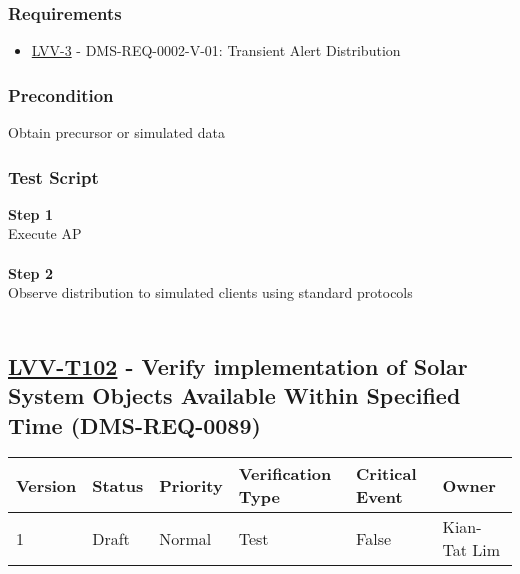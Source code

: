\hypertarget{requirements-78}{%
\subsubsection{Requirements}\label{requirements-78}}

\begin{itemize}
\tightlist
\item
  \href{https://jira.lsstcorp.org/browse/LVV-3}{LVV-3} -
  DMS-REQ-0002-V-01: Transient Alert Distribution
\end{itemize}

\hypertarget{precondition-10}{%
\subsubsection{Precondition}\label{precondition-10}}

{}Obtain precursor or simulated data

\hypertarget{test-script-78}{%
\subsubsection{Test Script}\label{test-script-78}}

\textbf{Step 1}\\
Execute AP\\
~\\
\textbf{Step 2}\\
Observe distribution to simulated clients using standard protocols\\
~\\

\hypertarget{lvv-t102---verify-implementation-of-solar-system-objects-available-within-specified-time-dms-req-0089}{%
\subsection{\texorpdfstring{\href{https://jira.lsstcorp.org/secure/Tests.jspa\#/testCase/LVV-T102}{LVV-T102}
- Verify implementation of Solar System Objects Available Within
Specified Time
(DMS-REQ-0089)}{LVV-T102 - Verify implementation of Solar System Objects Available Within Specified Time (DMS-REQ-0089)}}\label{lvv-t102---verify-implementation-of-solar-system-objects-available-within-specified-time-dms-req-0089}}

\begin{longtable}[]{@{}llllll@{}}
\toprule
Version & Status & Priority & Verification Type & Critical Event &
Owner\tabularnewline
\midrule
\endhead
1 & Draft & Normal & Test & False & Kian-Tat Lim\tabularnewline
\bottomrule
\end{longtable}

